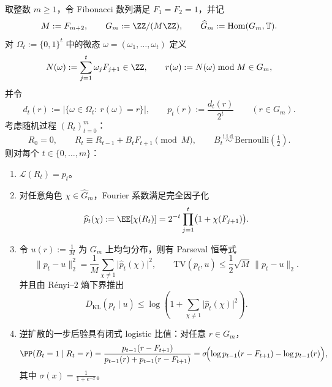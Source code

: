 \begin{theorem}\label{thm:xi-fib-congruence-diffusion-inverse-closed}
取整数 \(m\ge 1\)，令 Fibonacci 数列满足 \(F_1=F_2=1\)，并记
\[
M:=F_{m+2},\qquad G_m:=\ZZ/(M\ZZ),\qquad \widehat G_m:=\operatorname{Hom}(G_m,\mathbb T).
\]
对 \(\Omega_t:=\{0,1\}^t\) 中的微态 \(\omega=(\omega_1,\dots,\omega_t)\) 定义
\[
N(\omega):=\sum_{j=1}^{t}\omega_jF_{j+1}\in\ZZ,
\qquad
r(\omega):=N(\omega)\bmod M\in G_m,
\]
并令
\[
d_t(r):=\bigl|\{\omega\in\Omega_t:\ r(\omega)=r\}\bigr|,
\qquad
p_t(r):=\frac{d_t(r)}{2^t}\qquad(r\in G_m).
\]
考虑随机过程 \((R_t)_{t=0}^{m}\)：
\[
R_0=0,\qquad
R_t\equiv R_{t-1}+B_tF_{t+1}\pmod M,
\qquad
B_t\stackrel{\mathrm{i.i.d.}}{\sim}\mathrm{Bernoulli}\!\left(\tfrac12\right).
\]
则对每个 \(t\in\{0,\dots,m\}\)：
\begin{enumerate}
  \item \(\mathcal L(R_t)=p_t\)。
  \item 对任意角色 \(\chi\in\widehat G_m\)，Fourier 系数满足完全因子化
  \[
  \widehat p_t(\chi):=\EE[\chi(R_t)]
  =2^{-t}\prod_{j=1}^{t}\bigl(1+\chi(F_{j+1})\bigr).
  \]
  \item 令 \(u(r):=\frac{1}{M}\) 为 \(G_m\) 上均匀分布，则有 Parseval 恒等式
  \[
  \|p_t-u\|_2^2=\frac1M\sum_{\chi\neq 1}\bigl|\widehat p_t(\chi)\bigr|^2,
  \qquad
  \mathrm{TV}(p_t,u)\le \frac12\sqrt{M}\,\|p_t-u\|_2.
  \]
  并且由 Rényi--\(2\) 熵下界推出
  \[
  D_{\mathrm{KL}}(p_t\mid u)\le \log\!\left(1+\sum_{\chi\neq 1}\bigl|\widehat p_t(\chi)\bigr|^2\right).
  \]
  \item 逆扩散的一步后验具有闭式 logistic 比值：对任意 \(r\in G_m\)，
  \[
  \PP(B_t=1\mid R_t=r)
  =\frac{p_{t-1}(r-F_{t+1})}{p_{t-1}(r)+p_{t-1}(r-F_{t+1})}
  =\sigma\!\Bigl(\log p_{t-1}(r-F_{t+1})-\log p_{t-1}(r)\Bigr),
  \]
  其中 \(\sigma(x)=\frac{1}{1+e^{-x}}\)。
\end{enumerate}
\end{theorem}
